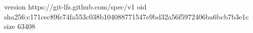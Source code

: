 version https://git-lfs.github.com/spec/v1
oid sha256:c171cec89fe74fa553c038b104088771547e9bd32a56f5972406ba6bcb7b3e1c
size 63408
